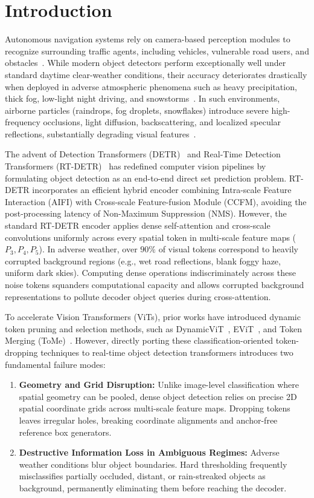 \documentclass[conference]{IEEEtran}
\begin{document}
\section{Introduction}
Autonomous navigation systems rely on camera-based perception modules to recognize surrounding traffic agents, including vehicles, vulnerable road users, and obstacles~\cite{sakaridis2021acdc}. While modern object detectors perform exceptionally well under standard daytime clear-weather conditions, their accuracy deteriorates drastically when deployed in adverse atmospheric phenomena such as heavy precipitation, thick fog, low-light night driving, and snowstorms~\cite{hassaballah2020vehicle, michaelis2019benchmarking}. In such environments, airborne particles (raindrops, fog droplets, snowflakes) introduce severe high-frequency occlusions, light diffusion, backscattering, and localized specular reflections, substantially degrading visual features~\cite{yang2020single, li2019single}.

The advent of Detection Transformers (DETR)~\cite{carion2020end} and Real-Time Detection Transformers (RT-DETR)~\cite{lv2023detrs} has redefined computer vision pipelines by formulating object detection as an end-to-end direct set prediction problem. RT-DETR incorporates an efficient hybrid encoder combining Intra-scale Feature Interaction (AIFI) with Cross-scale Feature-fusion Module (CCFM), avoiding the post-processing latency of Non-Maximum Suppression (NMS). However, the standard RT-DETR encoder applies dense self-attention and cross-scale convolutions uniformly across every spatial token in multi-scale feature maps ($P_3, P_4, P_5$). In adverse weather, over $90\%$ of visual tokens correspond to heavily corrupted background regions (e.g., wet road reflections, blank foggy haze, uniform dark skies). Computing dense operations indiscriminately across these noise tokens squanders computational capacity and allows corrupted background representations to pollute decoder object queries during cross-attention.

To accelerate Vision Transformers (ViTs), prior works have introduced dynamic token pruning and selection methods, such as DynamicViT~\cite{rao2021dynamicvit}, EViT~\cite{liang2022evit}, and Token Merging (ToMe)~\cite{bolya2022tome}. However, directly porting these classification-oriented token-dropping techniques to real-time object detection transformers introduces two fundamental failure modes:
\begin{enumerate}
    \item \textbf{Geometry and Grid Disruption:} Unlike image-level classification where spatial geometry can be pooled, dense object detection relies on precise 2D spatial coordinate grids across multi-scale feature maps. Dropping tokens leaves irregular holes, breaking coordinate alignments and anchor-free reference box generators.
    \item \textbf{Destructive Information Loss in Ambiguous Regimes:} Adverse weather conditions blur object boundaries. Hard thresholding frequently misclassifies partially occluded, distant, or rain-streaked objects as background, permanently eliminating them before reaching the decoder.
\end{enumerate}
\end{document}
